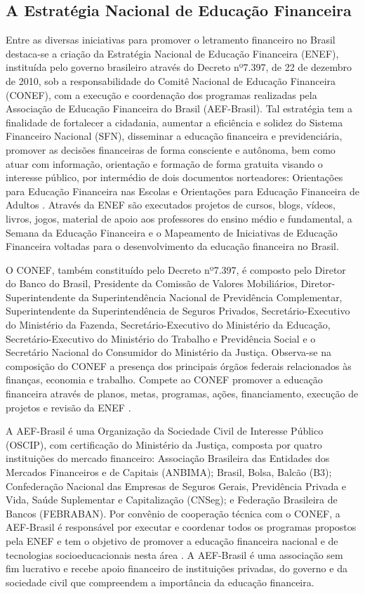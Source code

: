 \subsection{A Estratégia Nacional de Educação Financeira}
Entre as diversas iniciativas para promover o letramento financeiro no Brasil destaca-se a criação da Estratégia Nacional de Educação Financeira (ENEF), instituída pelo governo brasileiro através do Decreto nº7.397, de 22 de dezembro de 2010, sob a responsabilidade do Comitê Nacional de Educação Financeira (CONEF), com a execução e coordenação dos programas realizadas pela Associação de Educação Financeira do Brasil (AEF-Brasil). Tal estratégia tem a finalidade de fortalecer a cidadania, aumentar a eficiência e solidez do Sistema Financeiro Nacional (SFN), disseminar a educação financeira e previdenciária, promover as decisões financeiras de forma consciente e autônoma, bem como atuar com informação, orientação e formação de forma gratuita visando o interesse público, por intermédio de dois documentos norteadores: Orientações para Educação Financeira nas Escolas e Orientações para Educação Financeira de Adultos \cite{enef2010}. Através da ENEF são executados projetos de cursos, blogs, vídeos, livros, jogos, material de apoio aos professores do ensino médio e fundamental, a Semana da Educação Financeira e o Mapeamento de Iniciativas de Educação Financeira voltadas para o desenvolvimento da educação financeira no Brasil.

O CONEF, também constituído pelo Decreto nº7.397, é composto pelo Diretor do Banco do Brasil, Presidente da Comissão de Valores Mobiliários, Diretor-Superintendente da Superintendência Nacional de Previdência Complementar, Superintendente da Superintendência de Seguros Privados, Secretário-Executivo do Ministério da Fazenda, Secretário-Executivo do Ministério da Educação, Secretário-Executivo do Ministério do Trabalho e Previdência Social e o Secretário Nacional do Consumidor do Ministério da Justiça. Observa-se na composição do CONEF a presença dos principais órgãos federais relacionados às finanças, economia e trabalho. Compete ao CONEF promover a educação financeira através de planos, metas, programas, ações, financiamento, execução de projetos e revisão da ENEF \cite{brasil2010}.

A AEF-Brasil é uma Organização da Sociedade Civil de Interesse Público (OSCIP), com certificação do Ministério da Justiça, composta por quatro instituições do mercado financeiro: Associação Brasileira das Entidades dos Mercados Financeiros e de Capitais (ANBIMA); Brasil, Bolsa, Balcão (B3); Confederação Nacional das Empresas de Seguros Gerais, Previdência Privada e Vida, Saúde Suplementar e Capitalização (CNSeg); e Federação Brasileira de Bancos (FEBRABAN). Por convênio de cooperação técnica com o CONEF, a AEF-Brasil é responsável por executar e coordenar todos os programas propostos pela ENEF e tem o objetivo de promover a educação financeira nacional e de tecnologias socioeducacionais nesta área \cite{aefbrasil2011}. A AEF-Brasil é uma associação sem fim lucrativo e recebe apoio financeiro de instituições privadas, do governo e da sociedade civil que compreendem a importância da educação financeira.

